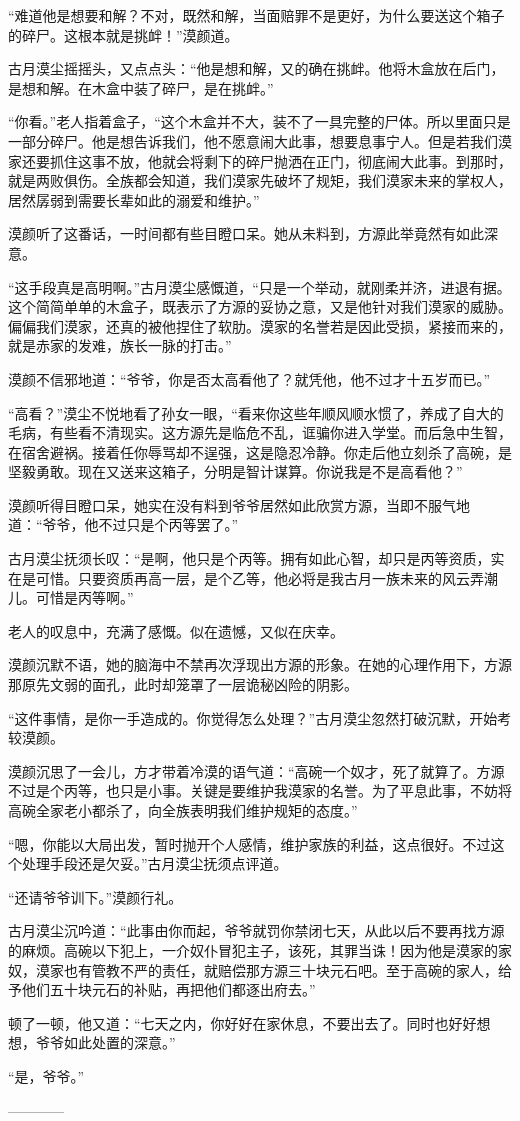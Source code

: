 \begin{this_body}
“难道他是想要和解？不对，既然和解，当面赔罪不是更好，为什么要送这个箱子的碎尸。这根本就是挑衅！”漠颜道。

古月漠尘摇摇头，又点点头：“他是想和解，又的确在挑衅。他将木盒放在后门，是想和解。在木盒中装了碎尸，是在挑衅。”

“你看。”老人指着盒子，“这个木盒并不大，装不了一具完整的尸体。所以里面只是一部分碎尸。他是想告诉我们，他不愿意闹大此事，想要息事宁人。但是若我们漠家还要抓住这事不放，他就会将剩下的碎尸抛洒在正门，彻底闹大此事。到那时，就是两败俱伤。全族都会知道，我们漠家先破坏了规矩，我们漠家未来的掌权人，居然孱弱到需要长辈如此的溺爱和维护。”

漠颜听了这番话，一时间都有些目瞪口呆。她从未料到，方源此举竟然有如此深意。

“这手段真是高明啊。”古月漠尘感慨道，“只是一个举动，就刚柔并济，进退有据。这个简简单单的木盒子，既表示了方源的妥协之意，又是他针对我们漠家的威胁。偏偏我们漠家，还真的被他捏住了软肋。漠家的名誉若是因此受损，紧接而来的，就是赤家的发难，族长一脉的打击。”

漠颜不信邪地道：“爷爷，你是否太高看他了？就凭他，他不过才十五岁而已。”

“高看？”漠尘不悦地看了孙女一眼，“看来你这些年顺风顺水惯了，养成了自大的毛病，有些看不清现实。这方源先是临危不乱，诓骗你进入学堂。而后急中生智，在宿舍避祸。接着任你辱骂却不逞强，这是隐忍冷静。你走后他立刻杀了高碗，是坚毅勇敢。现在又送来这箱子，分明是智计谋算。你说我是不是高看他？”

漠颜听得目瞪口呆，她实在没有料到爷爷居然如此欣赏方源，当即不服气地道：“爷爷，他不过只是个丙等罢了。”

古月漠尘抚须长叹：“是啊，他只是个丙等。拥有如此心智，却只是丙等资质，实在是可惜。只要资质再高一层，是个乙等，他必将是我古月一族未来的风云弄潮儿。可惜是丙等啊。”

老人的叹息中，充满了感慨。似在遗憾，又似在庆幸。

漠颜沉默不语，她的脑海中不禁再次浮现出方源的形象。在她的心理作用下，方源那原先文弱的面孔，此时却笼罩了一层诡秘凶险的阴影。

“这件事情，是你一手造成的。你觉得怎么处理？”古月漠尘忽然打破沉默，开始考较漠颜。

漠颜沉思了一会儿，方才带着冷漠的语气道：“高碗一个奴才，死了就算了。方源不过是个丙等，也只是小事。关键是要维护我漠家的名誉。为了平息此事，不妨将高碗全家老小都杀了，向全族表明我们维护规矩的态度。”

“嗯，你能以大局出发，暂时抛开个人感情，维护家族的利益，这点很好。不过这个处理手段还是欠妥。”古月漠尘抚须点评道。

“还请爷爷训下。”漠颜行礼。

古月漠尘沉吟道：“此事由你而起，爷爷就罚你禁闭七天，从此以后不要再找方源的麻烦。高碗以下犯上，一介奴仆冒犯主子，该死，其罪当诛！因为他是漠家的家奴，漠家也有管教不严的责任，就赔偿那方源三十块元石吧。至于高碗的家人，给予他们五十块元石的补贴，再把他们都逐出府去。”

顿了一顿，他又道：“七天之内，你好好在家休息，不要出去了。同时也好好想想，爷爷如此处置的深意。”

“是，爷爷。”

------------

\end{this_body}

